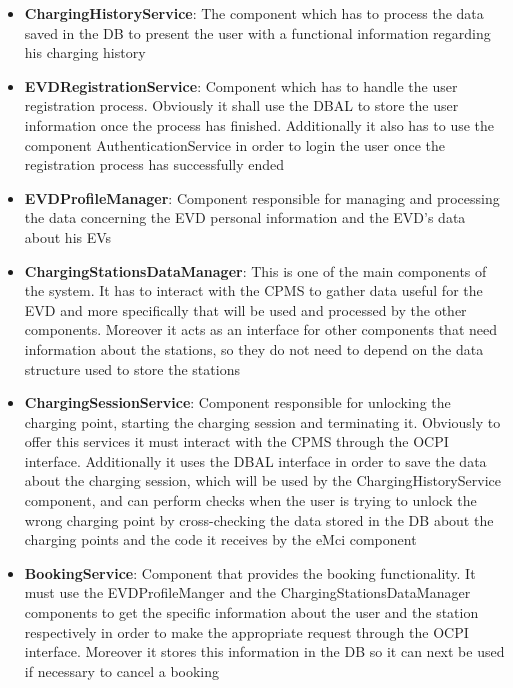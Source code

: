 \begin{itemize}
    \item \textbf{ChargingHistoryService}: The component which has to process the data saved in the DB to present the user with a functional information regarding his charging history

    \item \textbf{EVDRegistrationService}: Component which has to handle the user registration process. Obviously it shall use the DBAL to store the user information once the process has finished. Additionally it also has to use the component AuthenticationService in order to login the user once the registration process has successfully ended

    \item \textbf{EVDProfileManager}: Component responsible for managing and processing the data concerning the EVD personal information and the EVD's data about his EVs

    \item \textbf{ChargingStationsDataManager}: This is one of the main components of the system. It has to interact with the CPMS to gather data useful for the EVD and more specifically that will be used and processed by the other components. Moreover it acts as an interface for other components that need information about the stations, so they do not need to depend on the data structure used to store the stations

    \item \textbf{ChargingSessionService}: Component responsible for unlocking the charging point, starting the charging session and terminating it. Obviously to offer this services it must interact with the CPMS through the OCPI interface. Additionally it uses the DBAL interface in order to save the data about the charging session, which will be used by the ChargingHistoryService component, and can perform checks when the user is trying to unlock the wrong charging point by cross-checking the data stored in the DB about the charging points and the code it receives by the eMci component

    \item \textbf{BookingService}: Component that provides the booking functionality. It must use the EVDProfileManger and the ChargingStationsDataManager components to get the specific information about the user and the station respectively in order to make the appropriate request through the OCPI interface. Moreover it stores this information in the DB so it can next be used if necessary to cancel a booking
    

\end{itemize}

